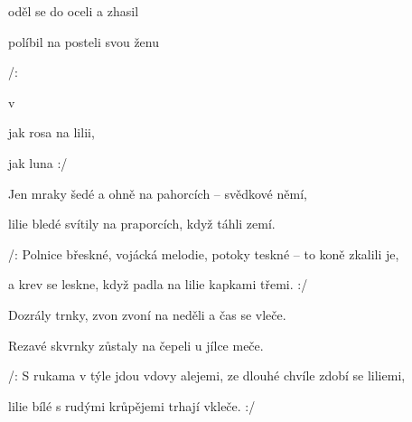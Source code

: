 

\zs
{} oděl se do oceli   a zhasil  

 políbil na posteli   svou ženu  

/:  

  v 

 jak rosa na lilii,

  jak luna  :/
\ks

     

\zs
Jen mraky šedé a ohně na pahorcích -- svědkové němí,

lilie bledé svítily na praporcích, když táhli zemí.

/: Polnice břeskné, vojácká melodie, potoky teskné -- to koně zkalili je,

a krev se leskne, když padla na lilie kapkami třemi. :/
\ks

     

\zs
Dozrály trnky, zvon zvoní na neděli a čas se vleče.

Rezavé skvrnky zůstaly na čepeli u jílce meče.

/: S rukama v týle jdou vdovy alejemi, ze dlouhé chvíle zdobí se liliemi,

lilie bílé s rudými krůpějemi trhají vkleče. :/
\ks

     

\kp
